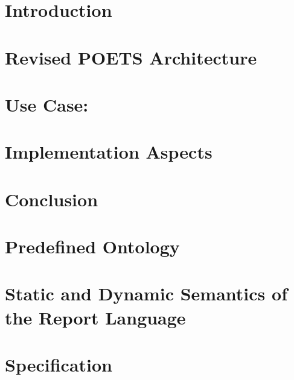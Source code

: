 \documentclass[10pt,draft]{article}
\begin{document}
\tableofcontents

\section{Introduction}
\label{sec:introduction}


\section{Revised POETS Architecture}
\label{sec:extended-poets}


\section{Use Case: \texorpdfstring{\muerp}{\textmu{}ERP}}
\label{sec:use-case}


\section{Implementation Aspects}
\label{sec:implementation-aspects}


\section{Conclusion}
\label{sec:conclusion}





\clearpage

\appendix

\section{Predefined Ontology}
\label{app:predefined-ontology}

\clearpage

\section{Static and Dynamic Semantics of the Report Language}
\label{sec:stat-dynam-semant}

\clearpage

\section{\texorpdfstring{\muerp}{\textmu{}ERP} Specification}
\label{app:muerp}

\end{document}
